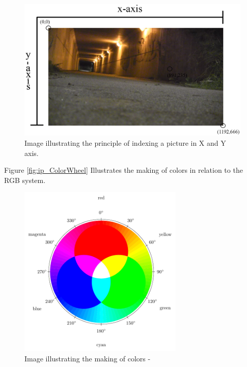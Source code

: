 \begin{figure}[htbp]
\centering
\includegraphics[width=1.00\textwidth]{Pictures/Theory/IndexingAPicture.png}
\caption{Image illustrating the principle of indexing a picture in X and Y axis.}
\label{fig:ip_IndexingAPicture}
\end{figure}


Figure \eqref{fig:ip_ColorWheel} Illustrates the making of colors in relation to the RGB system.\\
\begin{figure}[htbp]
\centering
\includegraphics[width=0.70\textwidth]{Pictures/Theory/RGBColor.pdf}
\caption{Image illustrating the making of colors - \citep{colorMixing}}
\label{fig:ip_ColorWheel}
\end{figure}  

